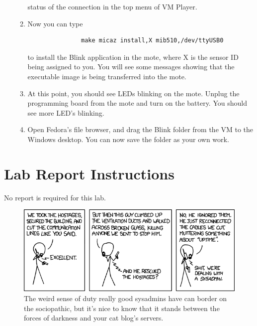\documentclass[letterpaper,12pt]{article}
\begin{document}
\begin{enumerate}
\begin{enumerate}
               status of the connection in the top menu of VM Player.
         \item Now you can type
               \begin{lstlisting}
               make micaz install,X mib510,/dev/ttyUSB0
               \end{lstlisting}
               to install the Blink application in the mote, where X is the sensor ID being
               assigned to you. You will see some messages showing that the executable image
               is being transferred into the mote.
         \item At this point, you should see LEDs blinking on the mote. Unplug the programming board
               from the mote and turn on the battery. You should see more LED's blinking.
         \item Open Fedora's file browser, and drag the Blink folder from the VM to the Windows desktop.
               You can now save the folder as your own work.
      \end{enumerate}
\end{enumerate}

\section*{Lab Report Instructions}
No report is required for this lab.

\begin{figure}[ht!]
	\centering
	\includegraphics[width=5in]{devotion_to_duty.png}
	\caption*{The weird sense of duty really good sysadmins have can border on the sociopathic, 
		but it's nice to know that it stands between the forces of darkness and your cat blog's servers.}
\end{figure}
\end{document}
